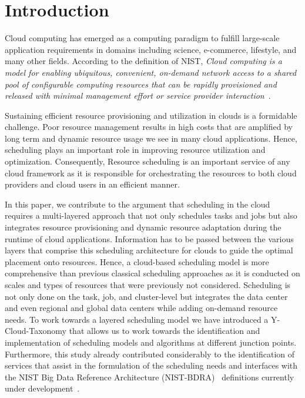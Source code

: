 \documentclass[final,5p,times,twocolumn]{elsarticle}
\begin{document}
\section{Introduction}

Cloud computing has emerged as a computing paradigm to fulfill large-scale application requirements in domains including science, e-commerce, lifestyle, and many other fields. According to the definition of NIST, {\em Cloud computing is a model for enabling ubiquitous, convenient, on-demand network access to a shared pool of configurable computing resources that can be rapidly provisioned and released with minimal management effort or service provider interaction}~\cite{mell2011nist}.

Sustaining efficient resource provisioning and utilization in clouds is a formidable challenge. Poor resource management results in high costs that are amplified by long term and dynamic resource usage we see in many cloud applications. Hence, scheduling plays an important role in improving resource utilization and optimization. Consequently, Resource scheduling is an important service of any cloud framework as it is responsible for orchestrating the resources to both cloud providers and cloud users in an efficient manner.

In this paper, we contribute to the argument that scheduling in the cloud requires a multi-layered approach that not only schedules tasks and jobs but also integrates resource provisioning and dynamic resource adaptation during the runtime of cloud applications. Information has to be passed between the various layers that comprise this scheduling architecture for clouds to guide the optimal placement onto resources. Hence, a cloud-based scheduling model is more comprehensive than previous classical scheduling approaches as it is conducted on scales and types of resources that were previously not considered. Scheduling is not only done on the task, job, and cluster-level but integrates the data center and even regional and global data centers while adding on-demand resource needs. To work towards a layered scheduling model we have introduced a Y-Cloud-Taxonomy that allows us to work towards the identification and implementation of scheduling models and algorithms at different junction points. Furthermore, this study already contributed considerably to the identification of services that assist in the formulation of the scheduling needs and interfaces with the NIST Big Data Reference Architecture (NIST-BDRA)~\cite{nist-bdra-vol6} definitions currently under development~\cite{nist-bdra-vol8}.
\end{document}
